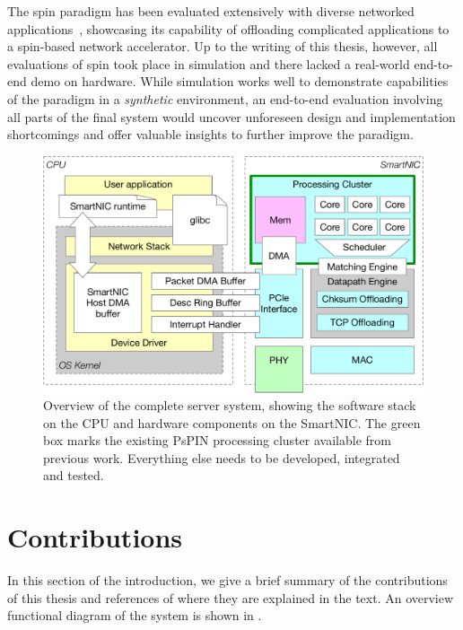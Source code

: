 The \ac{spin} paradigm has been evaluated extensively with diverse networked applications~\cite{di_girolamo_network-accelerated_2019, cao_accelerating_2022, di_girolamo_building_2022}, showcasing its capability of offloading complicated applications to a \ac{spin}-based network accelerator.  Up to the writing of this thesis, however, all evaluations of \ac{spin} took place in simulation and there lacked a real-world end-to-end demo on hardware.  While simulation works well to demonstrate capabilities of the paradigm in a \emph{synthetic} environment, an end-to-end evaluation involving all parts of the final system would uncover unforeseen design and implementation shortcomings and offer valuable insights to further improve the paradigm.

\begin{figure}
    \centering
    \includegraphics[width=.9\textwidth]{figures/system-overview.pdf}
    \caption{Overview of the complete server system, showing the software stack on the CPU and hardware components on the SmartNIC.  The green box marks the existing PsPIN processing cluster available from previous work.  Everything else needs to be developed, integrated and tested.}
    \label{fig:full-system}
\end{figure}

\section{Contributions} \label{sec:contributions}

In this section of the introduction, we give a brief summary of the contributions of this thesis and references of where they are explained in the text.  An overview functional diagram of the system is shown in .

